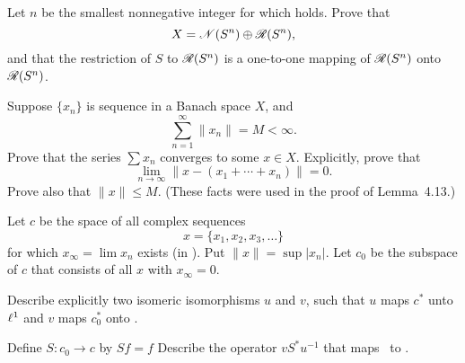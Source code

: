 \begin{enumerate}
\begin{excopy}
\begin{itemize}
Let $n$ be the smallest nonnegative integer for which  holds.
 Prove that
\begin{equation*}
X = \mathscr{N}(S^n) \oplus \mathscr{R}(S^n),
\end{equation*}
and that the restriction of $S$ to \(\mathscr{R}(S^n)\) is a one-to-one mapping
 of \(\mathscr{R}(S^n)\) onto \(\mathscr{R}(S^n)\).

\end{itemize}

\end{excopy}

\begin{itemize}




\end{itemize}



\unfinished

\begin{excopy}
Suppose \(\{x_n\}\) is sequence in a Banach space $X$, and
\begin{equation*}
 \sum_{n=1}^\infty \|x_n\| = M < \infty.
\end{equation*}
Prove that the series \(\sum x_n\) converges to some \(x \in X\).
 Explicitly, prove that
\begin{equation*}
\lim_{n\to\infty} \|x - (x_1 + \cdots + x_n)\| = 0.
\end{equation*}
Prove also that \(\|x\| \leq M\).
 (These facts were used in the proof of Lemma~4.13.)
\end{excopy}


\unfinished

\begin{excopy}
Let $c$ be the space of all complex sequences
\begin{equation*}
x = \{x_1,x_2,x_3,\ldots\}
\end{equation*}
for which \(x_\infty = \lim x_n\) exists (in \C).
 Put \(\|x\| = \sup |x_n|\). Let \(c_0\) be the subspace of $c$ that
consists of all $x$ with \(x_\infty = 0\).
\begin{itemize}

Describe explicitly two isomeric isomorphisms $u$ and $v$,
 such that $u$ maps \(c^*\) unto \(\ell^1\)
and $v$ maps \(c_0^*\) onto \ellone.

Define \(S: c_0 \to c\) by \(Sf = f\) Describe the operator
\(vS^*u^{-1}\) that maps \ellone\ to \ellone.


\end{itemize}
\end{excopy}
\end{enumerate}
